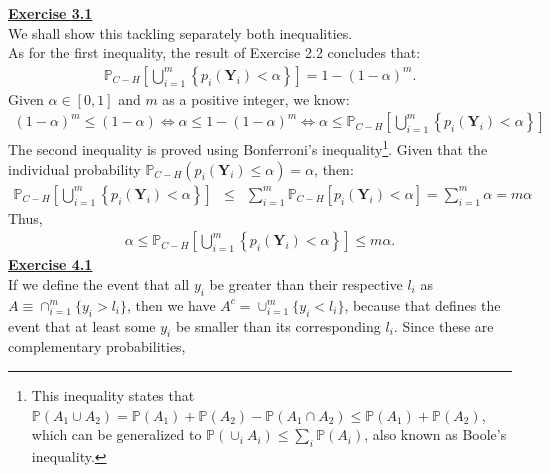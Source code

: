 \documentclass[a4paper, 11pt]{article}
\begin{document}
\newline \textbf{\underline{Exercise 3.1}}\\
\newline We shall show this tackling separately both inequalities.\\
\newline As for the first inequality, the result of Exercise 2.2 concludes that:\begin{eqnarray}
\mathbb{P}_{C-H} \left[ \bigcup_{i=1}^{m} \left\lbrace p_i(\mathbf{Y}_i) < \alpha \right\rbrace \right] = 1 - (1-\alpha)^m. \nonumber
\end{eqnarray}
Given $\alpha \in [0,1]$ and $m$ as a positive integer, we know:
\begin{eqnarray}
(1-\alpha)^m \leq (1 - \alpha) \Leftrightarrow \alpha \leq 1 - (1-\alpha)^m \Leftrightarrow \alpha \leq \mathbb{P}_{C-H} \left[ \bigcup_{i=1}^{m} \left\lbrace p_i(\mathbf{Y}_i) < \alpha \right\rbrace \right] \nonumber
\end{eqnarray}
The second inequality is proved using Bonferroni's inequality\footnote{This inequality states that $\mathbb{P}(A_1 \cup A_2) = \mathbb{P}(A_1) + \mathbb{P}(A_2) - \mathbb{P}(A_1 \cap A_2) \leq \mathbb{P}(A_1) + \mathbb{P}(A_2)$, which can be generalized to $\mathbb{P}(\cup_i A_i) \leq \sum_i \mathbb{P}(A_i)$, also known as Boole's inequality.}. Given that the individual probability $\mathbb{P}_{C-H}(p_{i}(\mathbf{Y}_i) \leq \alpha) = \alpha$, then:
\begin{eqnarray}
\mathbb{P}_{C-H} \left[ \bigcup_{i=1}^{m} \left\{ p_i(\mathbf{Y}_i) < \alpha \right\} \right] &\leq& \sum_{i=1}^{m} \mathbb{P}_{C-H} [ p_i(\mathbf{Y}_i) < \alpha ] = \sum_{i=1}^{m} \alpha = m \alpha \nonumber
\end{eqnarray}
Thus,
\begin{eqnarray}
\alpha \leq \mathbb{P}_{C-H} \left[ \bigcup_{i=1}^{m} \left\{ p_i(\mathbf{Y}_i) < \alpha \right\} \right] \leq m \alpha. \nonumber
\end{eqnarray}
\newline \textbf{\underline{Exercise 4.1}}\\
\newline If we define the event that all $y_i$ be greater than their respective $l_i$ as $A \equiv \cap_{i=1}^{m} \{y_i > l_i \}$, then we have $A^{c} = \cup_{i=1}^{m} \{y_i < l_i \}$, because that defines the event that at least some $y_i$ be smaller than its corresponding $l_i$. Since these are complementary probabilities,
\end{document}
